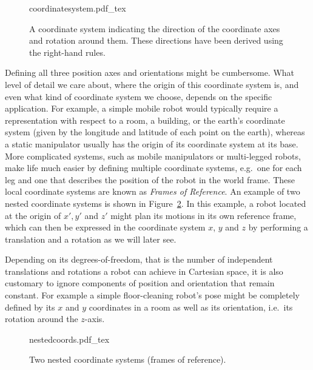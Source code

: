 \begin{figure}
    \centering
    \def\svgwidth{0.8\textwidth}
    {coordinatesystem.pdf_tex}
    \caption{A coordinate system indicating the direction of the coordinate axes and rotation around them. These directions have been derived using the right-hand rules.}
    \label{fig:coordinatesystem}
\end{figure}

Defining all three position axes and orientations might be cumbersome. What level of detail we care about, where the origin of this coordinate system is, and even what kind of coordinate system we choose, depends on the specific application. For example, a simple mobile robot would typically require a representation with respect to a room, a building, or the earth's coordinate system (given by the longitude and latitude of each point on the earth), whereas a static manipulator usually has the origin of its coordinate system at its base. More complicated systems, such as mobile manipulators or multi-legged robots, make life much easier by defining multiple coordinate systems, e.g.\ one for each leg and one that describes the position of the robot in the world frame. These local coordinate systems are known as \emph{Frames of Reference}.
An example of two nested coordinate systems is shown in Figure~\ref{fig:nestedcoords}. In this example, a robot located at the origin of $x',y'$ and $z'$ might plan its motions in its own reference frame, which can then be expressed in the coordinate system $x$, $y$ and $z$ by performing a translation and a rotation as we will later see.

Depending on its degrees-of-freedom, that is the number of independent translations and rotations a robot can achieve in Cartesian space, it is also customary to ignore components of position and orientation that remain constant. For example a simple floor-cleaning robot's pose might be completely defined by its $x$ and $y$ coordinates in a room as well as its orientation, i.e.\ its rotation around the $z$-axis.

\begin{figure}
    \centering
    \def\svgwidth{\textwidth}
    {nestedcoords.pdf_tex}
    \caption{Two nested coordinate systems (frames of reference).}
    \label{fig:nestedcoords}
\end{figure}

